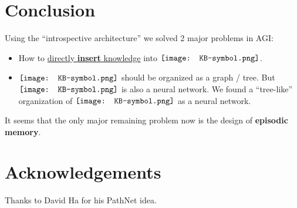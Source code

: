 \documentclass[orivec]{llncs}
\newcommand*\KB{\vcenter{\hbox{\texttt{[image: KB-symbol.png]}}}}
\begin{document}
\section{Conclusion}

Using the ``introspective architecture'' we solved 2 major problems in AGI:
\begin{itemize}
	\item How to \uline{directly \textbf{insert} knowledge} into $\KB$.
	
	\item $\KB$ should be organized as a graph / tree.  But $\KB$ is also a neural network.  We found a ``tree-like'' organization of $\KB$ as a neural network.
\end{itemize}

It seems that the only major remaining problem now is the design of \textbf{episodic memory}.

\section*{Acknowledgements}

Thanks to David Ha for his PathNet idea.


\end{document}
